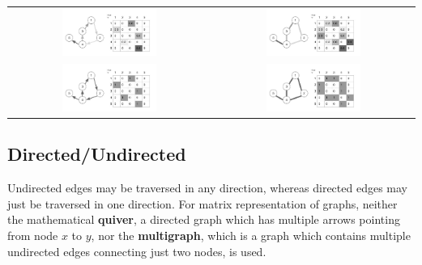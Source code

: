 \begin{table}[H]
  \centering
\begin{tabu}{cc}
	\includegraphics[width=0.49\textwidth]{images/directed_weighted_graph}
	 &
	\includegraphics[width=0.49\textwidth]{images/undirected_weighted_graph} \\
	\includegraphics[width=0.49\textwidth]{images/directed_graph}  &
	\includegraphics[width=0.49\textwidth]{images/undirected_graph} 
\end{tabu}
\end{table}


\subsection{Directed/Undirected}

Undirected edges may be traversed in any direction, whereas directed edges may just be traversed in one direction. For matrix representation of graphs, neither the mathematical \textbf{quiver}, a directed graph which has multiple arrows pointing from node $x$ to $y$, nor the \textbf{multigraph}, which is a graph which contains multiple undirected edges connecting just two nodes, is used.


